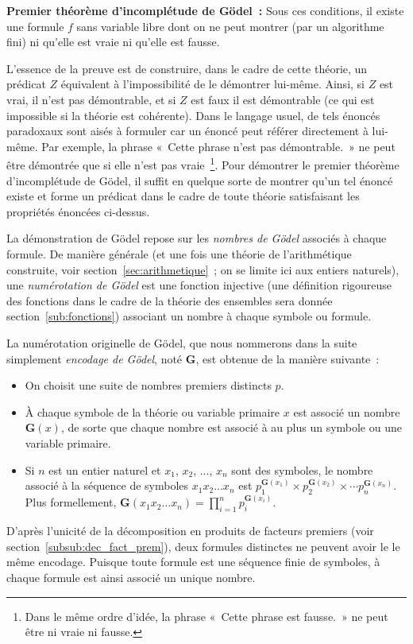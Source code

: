 \medskip

\noindent \textbf{Premier théorème d'incomplétude de Gödel :} Sous ces conditions, il existe une formule $f$ sans variable libre dont on ne peut montrer (par un algorithme fini) ni qu'elle est vraie ni qu'elle est fausse.

\medskip

L'essence de la preuve est de construire, dans le cadre de cette théorie, un prédicat $Z$ équivalent à l'impossibilité de le démontrer lui-même. 
Ainsi, si $Z$ est vrai, il n'est pas démontrable, et si $Z$ est faux il est démontrable (ce qui est impossible si la théorie est cohérente). 
Dans le langage usuel, de tels énoncés paradoxaux sont aisés à formuler car un énoncé peut référer directement à lui-même. 
Par exemple, la phrase « Cette phrase n'est pas démontrable. » ne peut être démontrée que si elle n'est pas vraie~\footnote{ Dans le même ordre d'idée, la phrase « Cette phrase est fausse. » ne peut être ni vraie ni fausse.}.
Pour démontrer le premier théorème d'incomplétude de Gödel, il suffit en quelque sorte de montrer qu'un tel énoncé existe et forme un prédicat dans le cadre de toute théorie satisfaisant les propriétés énoncées ci-dessus.

La démonstration de Gödel repose sur les \textit{nombres de Gödel} associés à chaque formule. 
De manière générale (et une fois une théorie de l'arithmétique construite, voir section~\ref{sec:arithmetique} ; on se limite ici aux entiers naturels), une \textit{numérotation de Gödel} est une fonction injective (une définition rigoureuse des fonctions dans le cadre de la théorie des ensembles sera donnée section~\ref{sub:fonctions}) associant un nombre à chaque symbole ou formule. 

La numérotation originelle de Gödel, que nous nommerons dans la suite simplement \textit{encodage de Gödel}, noté $\mathbf{G}$, est obtenue de la manière suivante : 
\begin{itemize}[nosep]
    \item On choisit une suite de nombres premiers distincts $p$. 
    \item À chaque symbole de la théorie ou variable primaire $x$ est associé un nombre $\mathbf{G}(x)$, de sorte que chaque nombre est associé à au plus un symbole ou une variable primaire. 
    \item Si $n$ est un entier naturel et $x_1$, $x_2$, ..., $x_n$ sont des symboles, le nombre associé à la séquence de symboles $x_1 x_2 \dots x_n$ est $p_1^{\mathbf{G}(x_1)} \times p_2^{\mathbf{G}(x_2)} \times \cdots p_n^{\mathbf{G}(x_n)}$.
        Plus formellement, $\mathbf{G}(x_1 x_2 \dots x_n) = \prod_{i=1}^n p_i^{\mathbf{G}(x_i)}$. 
\end{itemize}
D'après l'unicité de la décomposition en produits de facteurs premiers (voir section~\ref{subsub:dec_fact_prem}), deux formules distinctes ne peuvent avoir le le même encodage.
Puisque toute formule est une séquence finie de symboles, à chaque formule est ainsi associé un unique nombre.

